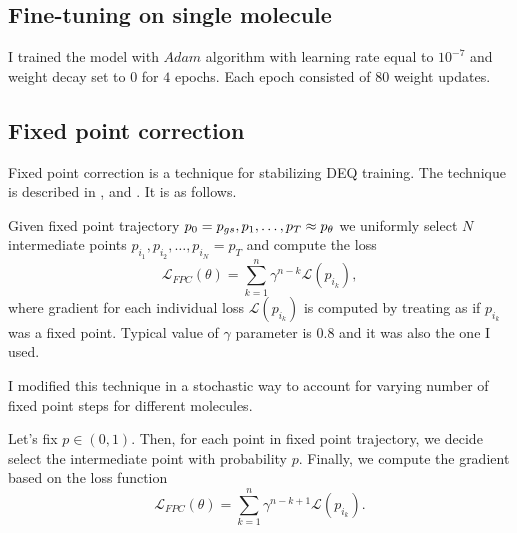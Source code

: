 \documentclass[a4paper,10.5pt]{report}
\begin{document}
\subsection{Fine-tuning on single molecule}
I trained the model with $Adam$ algorithm with learning rate equal to $10^{-7}$ and weight decay set to $0$ for $4$ epochs. Each epoch consisted of $80$ weight updates.
%

\subsection{Fixed point correction}\label{sec:fpc}
Fixed point correction is a technique for stabilizing DEQ training. The technique is described in \cite{opticalflow}, \cite{geng2023torchdeq}
and \cite{burger2025dequify}. It is as follows.

Given fixed point trajectory $p_0= p_{gs}, p_1,\ldots, p_T\approx  p_\theta $ we uniformly select $N$ intermediate points $p_{i_1}, p_{i_2}, \ldots , p_{i_N}=p_T$ and compute the loss
\begin{equation}
 \mathcal{L}_{FPC}(\theta) = \sum_{k=1}^{n}\gamma^{n-k}\mathcal{L}(p_{i_k}),
\end{equation}
where gradient for each individual loss $\mathcal{L}(p_{i_k})$ is computed by treating as if $p_{i_k}$ was a fixed point. Typical value of $\gamma$ parameter is $0.8$ and it was also the one I used.
\par
I modified this technique in a stochastic way to account for varying number of fixed point steps for different molecules.

Let's fix $p\in (0,1)$. Then, for each point in fixed point trajectory, we decide select the intermediate point with probability $p$.
Finally, we compute the gradient based on the loss function
\begin{equation}
 \mathcal{L}_{FPC}(\theta) = \sum_{k=1}^{n}\gamma^{n-k+1}\mathcal{L}(p_{i_k}).
\end{equation}
\end{document}
